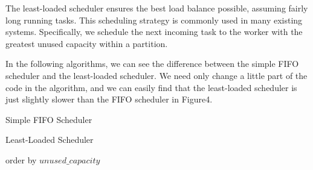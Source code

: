 \documentclass[11pt,a4paper]{article}
\begin{document}
The least-loaded scheduler ensures the best load balance possible, assuming fairly long running tasks. 
This scheduling strategy is commonly used in many existing systems.
Specifically, we schedule the next incoming task to the worker with the greatest unused capacity within a partition.\cite{10.14778/3485450.3485454}

In the following algorithms, we can see the difference between the simple FIFO scheduler and the least-loaded scheduler. We need only change a little part of the code in the algorithm, 
and we can easily find that the least-loaded scheduler is just slightly slower than the FIFO scheduler in Figure4.

\begin{minipage}[t]{0.9\textwidth}
    \begin{algorithm}[H]
        
        \BlankLine
        \caption{Simple FIFO Scheduler}
        
    \end{algorithm}
\end{minipage}

\begin{minipage}[t]{0.9\textwidth}
    \begin{algorithm}[H]
        
        \BlankLine
        \caption{Least-Loaded Scheduler}
        order by $unused\_capacity$\;
    \end{algorithm}
\end{minipage}
\end{document}

